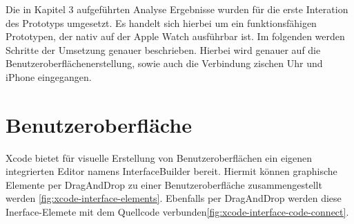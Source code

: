 
Die in Kapitel 3 aufgeführten Analyse Ergebnisse wurden für die erste Interation des Prototyps umgesetzt. Es handelt sich hierbei um ein funktionsfähigen Prototypen, der nativ auf der Apple Watch ausführbar ist. Im folgenden werden Schritte der Umsetzung genauer beschrieben. Hierbei wird genauer auf die Benutzeroberflächenerstellung, sowie auch die Verbindung zischen Uhr und iPhone eingegangen.

\section{Benutzeroberfläche}
Xcode bietet für visuelle Erstellung von Benutzeroberflächen ein eigenen integrierten Editor namens InterfaceBuilder bereit. Hiermit können graphische Elemente per DragAndDrop zu einer Benutzeroberfläche zusammengestellt werden \ref{fig:xcode-interface-elements}. Ebenfalls per DragAndDrop werden diese Inerface-Elemete mit dem Quellcode verbunden\ref{fig:xcode-interface-code-connect}.

